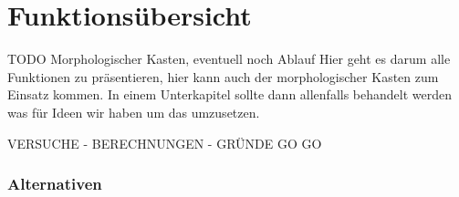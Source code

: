 \section{Funktionsübersicht}
TODO Morphologischer Kasten, eventuell noch Ablauf Hier geht es darum alle Funktionen zu präsentieren, hier kann auch der morphologischer Kasten zum Einsatz kommen.
In einem Unterkapitel sollte dann allenfalls behandelt werden was für Ideen wir haben um das umzusetzen.

VERSUCHE - BERECHNUNGEN - GRÜNDE GO GO



















\subsubsection{Alternativen}

